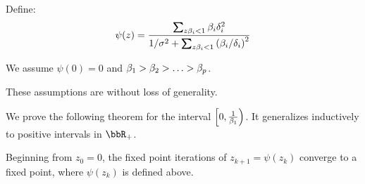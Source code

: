 \documentclass[12pt,leqno,letterpaper]{article}
\begin{document}
Define:
\begin{align}
\psi(z) = \frac{\sum_{z \gb_i <1} \gb_i \gd_i^2}{1/\gs^2 + \sum_{z \gb_i<1} \paren{\gb_i/\gd_i}^2}
\end{align}
\begin{assumption}
We assume $\psi(0)=0$ and $\beta_1 > \beta_2 > \ldots > \beta_p$.
\end{assumption}
\begin{remark}
These assumptions are without loss of generality.
\end{remark}
\begin{remark}
We prove the following theorem for the interval $\left[0,\frac{1}{\beta_1}\right)$.  It generalizes inductively to positive intervals in $\bbR_+$.
\end{remark}
\begin{theorem}
Beginning from $z_0=0$, the fixed point iterations of $z_{k+1}=\psi(z_k)$ converge to a fixed point, where $\psi(z_k)$ is defined above.
\end{theorem}
\end{document}
